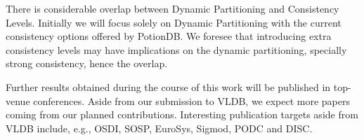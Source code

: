There is considerable overlap between Dynamic Partitioning and Consistency Levels.
Initially we will focus solely on Dynamic Partitioning with the current consistency options offered by PotionDB.
We foresee that introducing extra consistency levels may have implications on the dynamic partitioning, specially strong consistency, hence the overlap.



Further results obtained during the course of this work will be published in top-venue conferences.
Aside from our submission to VLDB, we expect more papers coming from our planned contributions.
Interesting publication targets aside from VLDB include, e.g., OSDI, SOSP, EuroSys, Sigmod, PODC and DISC.


